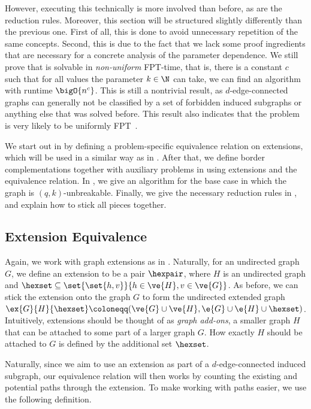 However, executing this technically is more involved than before, as are the reduction rules.
Moreover, this section will be structured slightly differently than the previous one. First of all, this is done to avoid unnecessary repetition of the same concepts. Second, this is due to the fact that we lack some proof ingredients that are necessary for a concrete analysis of the parameter dependence. We still prove that \prob{} is solvable in \emph{non-uniform} FPT-time, that is, there is a constant $c$ such that for all values the parameter $k \in \N$ can take, we can find an algorithm with runtime $\bigO{n^c}$. This is still a nontrivial result, as $d$-edge-connected graphs can generally not be classified by a set of forbidden induced subgraphs or anything else that was solved before. This result also indicates that the problem is very likely to be uniformly FPT~\cite[Chapter~6]{cygan2015parameterized}.

We start out in  by defining a problem-specific equivalence relation on extensions, which will be used in a similar way as in . After that, we define border complementations together with auxiliary problems in  using extensions and the equivalence relation. In , we give an algorithm for the base case in which the graph is $(q,k)$-unbreakable. Finally, we give the necessary reduction rules in , and explain how to stick all pieces together.

\subsection{Extension Equivalence}\label{sec:ext_equiv}

Again, we work with graph extensions as in . Naturally, for an undirected graph $G$, we define an extension to be a pair $\hexpair$, where $H$ is an undirected graph and $\hexset \subseteq \set{\set{h,v}}{h \in \ve{H}, v \in \ve{G}}$. As before, we can stick the extension onto the graph $G$ to form the undirected extended graph $\ex{G}{H}{\hexset} \coloneqq (\ve{G} \cup \ve{H}, \e{G} \cup \e{H} \cup \hexset)$. Intuitively, extensions should be thought of as \emph{graph add-ons}, a smaller graph $H$ that can be attached to some part of a larger graph $G$. How exactly $H$ should be attached to $G$ is defined by the additional set $\hexset$.

Naturally, since we aim to use an extension as part of a $d$-edge-connected induced subgraph, our equivalence relation will then works by counting the existing and potential paths through the extension. To make working with paths easier, we use the following definition. 

